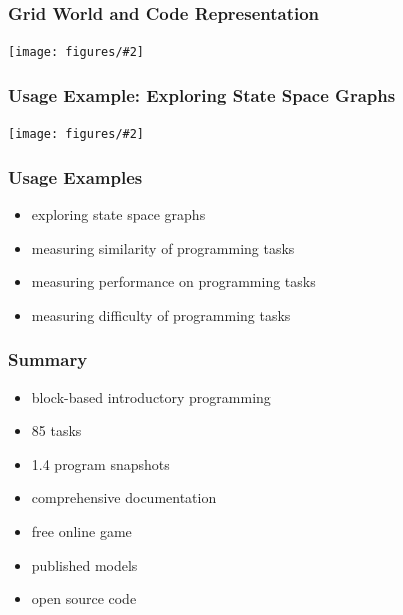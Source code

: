 \documentclass[bigger]{beamer}
\newcommand{\img}[2]{
  \begin{center}
    \texttt{[image: figures/\#2]}
  \end{center}
}
\begin{document}
\begin{frame}
  \frametitle{Grid World and Code Representation}

  \img{1.}{task-setting-solution}

\end{frame}


\begin{frame}
  \frametitle{Usage Example: Exploring State Space Graphs}

  \img{1.}{statespace-clean-path}

\end{frame}

\begin{frame}
  \frametitle{Usage Examples}

  \begin{itemize}
  \item exploring state space graphs  %
  \item measuring similarity of programming tasks
  \item measuring performance on programming tasks
  \item measuring difficulty of programming tasks
  \end{itemize}
\end{frame}


\begin{frame}
  \frametitle{Summary}

  \begin{itemize}
  \item block-based introductory programming
  \item 85 tasks
  \item 1.4 program snapshots  %
  \item comprehensive documentation  %
  \item free online game
  \item published models
  \item open source code
  \end{itemize}
\end{frame}
\end{document}
